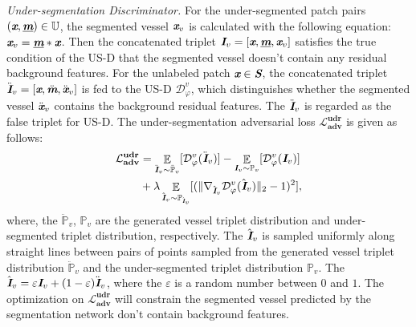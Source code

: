 \documentclass[letterpaper]{article} %
\begin{document}
\emph{Under-segmentation Discriminator.}
For the under-segmented patch pairs $(\textbf{\em x},\underline{\textbf{\em m}}) \in \mathbb{U}$,
the segmented vessel $\textbf{\em x}_v$ is calculated with the following equation:
$\textbf{\em x}_v=\underline{\textbf{\em m}}*\textbf{\em x}$.
Then the concatenated triplet $\textbf{\em I}_v=[\textbf{\em x},\underline{\textbf{\em m}},\textbf{\em x}_v]$ satisfies the true condition of the US-D
that the segmented vessel doesn't contain any residual background features.
For the unlabeled patch $\textbf{\em x} \in \textbf{\em S}$,
the concatenated triplet $\ddot{\textbf{\em I}}_v=[\textbf{\em x},\ddot{\textbf{\em m}},\ddot{\textbf{\em x}}_v]$ is fed to the US-D $\mathcal{D}^v_{\varphi}$, which distinguishes whether the segmented vessel $\ddot{\textbf{\em x}}_v$ contains the background residual features.
The $\ddot{\textbf{\em I}}_v$ is regarded as the false triplet for US-D.
The under-segmentation adversarial loss $\mathbf{\mathcal{L}^{udr}_{adv}}$ is given as follows:
\begin{equation}\label{eq4}
\begin{split}
\mathbf{\mathcal{L}^{udr}_{adv}}& = \mathop{\mathbb{E}}\limits_{\ddot{\textbf{\em I}}_v \sim \ddot{\mathbb{P}}_v} [\mathcal{D}^v_{\varphi}(\ddot{\textbf{\em I}}_v)]
-\mathop{\mathbb{E}}\limits_{\textbf{\em I}_v \sim \mathbb{P}_v} [\mathcal{D}^v_{\varphi}(\textbf{\em I}_v)]  \\
& +\lambda \mathop{\mathbb{E}}\limits_{\hat{\textbf{\em I}}_v\sim \mathbb{P}_{\hat{\textbf{\em I}}_v}} [(\|\nabla_{\hat{\textbf{\em I}}_v} \mathcal{D}^{v}_{\varphi}(\hat{\textbf{\em I}}_v)\|_{2} - 1)^2],
\end{split}
\end{equation}
where, the $\ddot{\mathbb{P}}_v$, $\mathbb{P}_v$ are the generated vessel triplet distribution and under-segmented triplet distribution, respectively.
The $\hat{\textbf{\em I}}_v$ is sampled uniformly along straight lines between pairs of points sampled from the generated vessel triplet distribution $\ddot{\mathbb{P}}_v$ and the under-segmented triplet distribution $\mathbb{P}_v$.
The $\hat{\textbf{\em I}}_v=\varepsilon \textbf{\em I}_v+(1-\varepsilon)\ddot{\textbf{\em I}}_v$, where the $\varepsilon$ is a random number between $0$ and $1$.
The optimization on $\mathbf{\mathcal{L}^{udr}_{adv}}$ will constrain the segmented vessel predicted by the segmentation network
don't contain background features.
\end{document}
